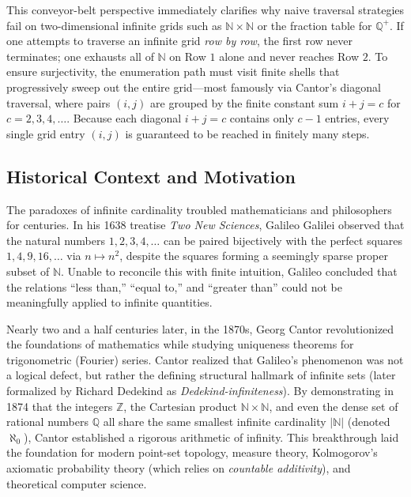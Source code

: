\documentclass[11pt, letterpaper]{article}
\theoremstyle{definition}
\theoremstyle{remark}
\begin{document}
This conveyor-belt perspective immediately clarifies why naive traversal strategies fail on two-dimensional infinite grids such as $\mathbb{N} \times \mathbb{N}$ or the fraction table for $\mathbb{Q}^+$. If one attempts to traverse an infinite grid \emph{row by row}, the first row never terminates; one exhausts all of $\mathbb{N}$ on Row $1$ alone and never reaches Row $2$. To ensure surjectivity, the enumeration path must visit finite shells that progressively sweep out the entire grid---most famously via Cantor's diagonal traversal, where pairs $(i, j)$ are grouped by the finite constant sum $i + j = c$ for $c = 2, 3, 4, \dots$. Because each diagonal $i + j = c$ contains only $c - 1$ entries, every single grid entry $(i, j)$ is guaranteed to be reached in finitely many steps.

\subsection{Historical Context and Motivation}

The paradoxes of infinite cardinality troubled mathematicians and philosophers for centuries. In his 1638 treatise \emph{Two New Sciences}, Galileo Galilei observed that the natural numbers $1, 2, 3, 4, \dots$ can be paired bijectively with the perfect squares $1, 4, 9, 16, \dots$ via $n \mapsto n^2$, despite the squares forming a seemingly sparse proper subset of $\mathbb{N}$. Unable to reconcile this with finite intuition, Galileo concluded that the relations ``less than,'' ``equal to,'' and ``greater than'' could not be meaningfully applied to infinite quantities.

Nearly two and a half centuries later, in the 1870s, Georg Cantor revolutionized the foundations of mathematics while studying uniqueness theorems for trigonometric (Fourier) series. Cantor realized that Galileo's phenomenon was not a logical defect, but rather the defining structural hallmark of infinite sets (later formalized by Richard Dedekind as \emph{Dedekind-infiniteness}). By demonstrating in 1874 that the integers $\mathbb{Z}$, the Cartesian product $\mathbb{N} \times \mathbb{N}$, and even the dense set of rational numbers $\mathbb{Q}$ all share the same smallest infinite cardinality $|\mathbb{N}|$ (denoted $\aleph_0$), Cantor established a rigorous arithmetic of infinity. This breakthrough laid the foundation for modern point-set topology, measure theory, Kolmogorov's axiomatic probability theory (which relies on \emph{countable additivity}), and theoretical computer science.
\end{document}

